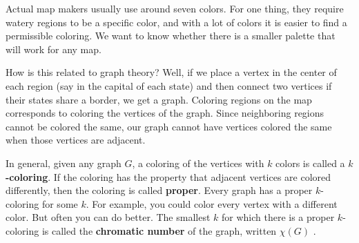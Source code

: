 \documentclass[10pt,]{book}
\newcommand{\terminology}[1]{\textbf{#1}}
\theoremstyle{plain}
\theoremstyle{definition}
\theoremstyle{definition}
\theoremstyle{definition}
\numberwithin{equation}{chapter}
\begin{document}
\hypertarget{p-336}{}%
Actual map makers usually use around seven colors. For one thing, they require watery regions to be a specific color, and with a lot of colors it is easier to find a permissible coloring. We want to know whether there is a smaller palette that will work for any map.%
\par
\hypertarget{p-337}{}%
How is this related to graph theory? Well, if we place a vertex in the center of each region (say in the capital of each state) and then connect two vertices if their states share a border, we get a graph. Coloring regions on the map corresponds to coloring the vertices of the graph. Since neighboring regions cannot be colored the same, our graph cannot have vertices colored the same when those vertices are adjacent.%
\par
\hypertarget{p-338}{}%
In general, given any graph \(G\), a coloring of the vertices with \(k\) colors is called a \terminology{\(k\)-coloring}. If the coloring has the property that adjacent vertices are colored differently, then the coloring is called \terminology{proper}. Every graph has a proper \(k\)-coloring for some \(k\). For example, you could color every vertex with a different color. But often you can do better. The smallest \(k\) for which there is a proper \(k\)-coloring is called the \terminology{chromatic number} of the graph, written \(\chi(G)\)\label{notation-6}
.%
\end{document}
